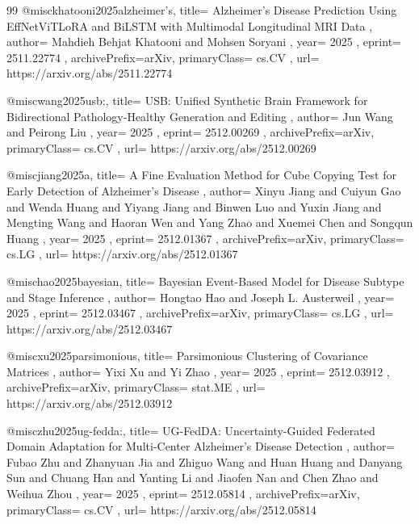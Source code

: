 \documentclass[11pt,a4paper]{article}
\begin{document}
\begin{thebibliography}{99}
@misc{khatooni2025alzheimer's,
  title={ Alzheimer's Disease Prediction Using EffNetViTLoRA and BiLSTM with Multimodal Longitudinal MRI Data },
  author={ Mahdieh Behjat Khatooni and Mohsen Soryani },
  year={ 2025 },
  eprint={ 2511.22774 },
  archivePrefix={arXiv},
  primaryClass={ cs.CV },
  url={ https://arxiv.org/abs/2511.22774 }
}


@misc{wang2025usb:,
  title={ USB: Unified Synthetic Brain Framework for Bidirectional Pathology-Healthy Generation and Editing },
  author={ Jun Wang and Peirong Liu },
  year={ 2025 },
  eprint={ 2512.00269 },
  archivePrefix={arXiv},
  primaryClass={ cs.CV },
  url={ https://arxiv.org/abs/2512.00269 }
}


@misc{jiang2025a,
  title={ A Fine Evaluation Method for Cube Copying Test for Early Detection of Alzheimer's Disease },
  author={ Xinyu Jiang and Cuiyun Gao and Wenda Huang and Yiyang Jiang and Binwen Luo and Yuxin Jiang and Mengting Wang and Haoran Wen and Yang Zhao and Xuemei Chen and Songqun Huang },
  year={ 2025 },
  eprint={ 2512.01367 },
  archivePrefix={arXiv},
  primaryClass={ cs.LG },
  url={ https://arxiv.org/abs/2512.01367 }
}


@misc{hao2025bayesian,
  title={ Bayesian Event-Based Model for Disease Subtype and Stage Inference },
  author={ Hongtao Hao and Joseph L. Austerweil },
  year={ 2025 },
  eprint={ 2512.03467 },
  archivePrefix={arXiv},
  primaryClass={ cs.LG },
  url={ https://arxiv.org/abs/2512.03467 }
}


@misc{xu2025parsimonious,
  title={ Parsimonious Clustering of Covariance Matrices },
  author={ Yixi Xu and Yi Zhao },
  year={ 2025 },
  eprint={ 2512.03912 },
  archivePrefix={arXiv},
  primaryClass={ stat.ME },
  url={ https://arxiv.org/abs/2512.03912 }
}


@misc{zhu2025ug-fedda:,
  title={ UG-FedDA: Uncertainty-Guided Federated Domain Adaptation for Multi-Center Alzheimer's Disease Detection },
  author={ Fubao Zhu and Zhanyuan Jia and Zhiguo Wang and Huan Huang and Danyang Sun and Chuang Han and Yanting Li and Jiaofen Nan and Chen Zhao and Weihua Zhou },
  year={ 2025 },
  eprint={ 2512.05814 },
  archivePrefix={arXiv},
  primaryClass={ cs.CV },
  url={ https://arxiv.org/abs/2512.05814 }
}



\end{thebibliography}
\end{document}
